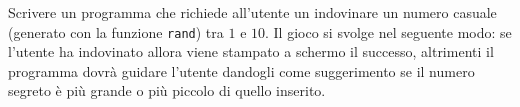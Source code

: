 \begin{Exercise}[label={ex:segreto}]
  Scrivere un programma che richiede all'utente un indovinare un numero casuale (generato con la funzione \texttt{rand}) tra $1$ e $10$. Il gioco si svolge nel seguente modo: se l'utente ha indovinato allora viene stampato a schermo il successo, altrimenti il programma dovr\`a guidare l'utente dandogli come suggerimento se il numero segreto \`e pi\`u grande o pi\`u piccolo di quello inserito.
\end{Exercise}

\begin{Answer}[ref={ex:segreto}]
		
\end{Answer}